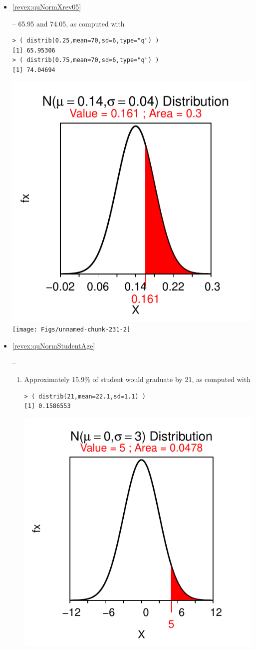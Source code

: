 \documentclass[10pt,openany]{book}\usepackage[]{graphicx}\usepackage[]{color}
\makeatletter
\newenvironment{kframe}{%
 \def\at@end@of@kframe{}%
 \ifinner\ifhmode%
  \def\at@end@of@kframe{\end{minipage}}%
  \begin{minipage}{\columnwidth}%
 \fi\fi%
 \def\FrameCommand##1{\hskip\@totalleftmargin \hskip-\fboxsep
 \colorbox{shadecolor}{##1}\hskip-\fboxsep
     \hskip-\linewidth \hskip-\@totalleftmargin \hskip\columnwidth}%
 \MakeFramed {\advance\hsize-\width
   \@totalleftmargin\z@ \linewidth\hsize
   \@setminipage}}%
 {\par\unskip\endMakeFramed%
 \at@end@of@kframe}
\newenvironment{knitrout}{}{} %
\makeatother
\begin{document}
\begin{itemize}
\begin{knitrout}
{}



\end{knitrout}
  \item \hypertarget{ans:quNormXrev05}{\ref{revex:quNormXrev05}} -- 65.95 and 74.05, as computed with
\begin{knitrout}
\color{fgcolor}\begin{kframe}
\begin{verbatim}
> ( distrib(0.25,mean=70,sd=6,type="q") )
[1] 65.95306
> ( distrib(0.75,mean=70,sd=6,type="q") )
[1] 74.04694
\end{verbatim}
\end{kframe}

{\centering \includegraphics[width=.4\linewidth]{Figs/unnamed-chunk-231-1} 
\texttt{[image: Figs/unnamed-chunk-231-2]} 

}



\end{knitrout}

  \item \hypertarget{ans:quNormStudentAge}{\ref{revex:quNormStudentAge}} --
    \begin{enumerate}
      \item Approximately 15.9\% of student would graduate by 21, as computed with
\begin{knitrout}
\color{fgcolor}\begin{kframe}
\begin{verbatim}
> ( distrib(21,mean=22.1,sd=1.1) )
[1] 0.1586553
\end{verbatim}
\end{kframe}

{\centering \includegraphics[width=.4\linewidth]{Figs/unnamed-chunk-232-1} 

}
\end{knitrout}
\end{enumerate}
\end{itemize}
\end{document}
